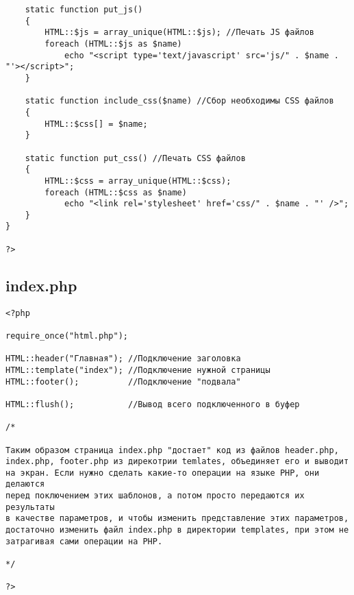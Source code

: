 \documentclass[a4paper]{article}
\begin{document}
\begin{verbatim}
    static function put_js()
    {
        HTML::$js = array_unique(HTML::$js); //Печать JS файлов
        foreach (HTML::$js as $name)
            echo "<script type='text/javascript' src='js/" . $name . "'></script>";
    }

    static function include_css($name) //Сбор необходимы CSS файлов
    {
        HTML::$css[] = $name;
    }

    static function put_css() //Печать CSS файлов
    {
        HTML::$css = array_unique(HTML::$css);
        foreach (HTML::$css as $name)
            echo "<link rel='stylesheet' href='css/" . $name . "' />";
    }
}

?>
\end{verbatim}

\subsection{index.php}
\begin{verbatim}
<?php

require_once("html.php");

HTML::header("Главная"); //Подключение заголовка
HTML::template("index"); //Подключение нужной страницы
HTML::footer();          //Подключение "подвала"

HTML::flush();           //Вывод всего подключенного в буфер

/*

Таким образом страница index.php "достает" код из файлов header.php,
index.php, footer.php из дирекотрии temlates, объединяет его и выводит
на экран. Если нужно сделать какие-то операции на языке PHP, они делаются
перед поключением этих шаблонов, а потом просто передаются их результаты
в качестве параметров, и чтобы изменить представление этих параметров,
достаточно изменить файл index.php в директории templates, при этом не
затрагивая сами операции на PHP. 

*/

?>
\end{verbatim}
\end{document}
